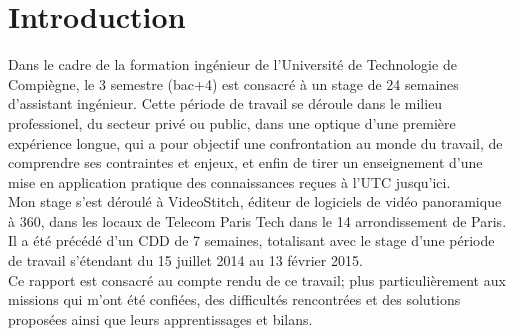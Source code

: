 \chapter*{Introduction}
Dans le cadre de la formation ingénieur de l'Université de Technologie de Compiègne,
le 3 semestre (bac+4) est consacré à un stage de 24 semaines d'assistant ingénieur.
Cette période de travail se déroule dans le milieu professionel, du secteur
privé ou public, dans une optique d'une première expérience longue, qui a pour
objectif une confrontation au monde du travail, de comprendre ses contraintes et 
enjeux, et enfin de tirer un enseignement d'une mise en application pratique des
connaissances reçues à l'UTC jusqu'ici.\\
\newline
Mon stage s'est déroulé à VideoStitch, éditeur de logiciels de vidéo panoramique
à 360\degree, dans les locaux de Telecom Paris Tech dans le 14 arrondissement de Paris. 
Il a été précédé d'un CDD de 7 semaines, totalisant avec le stage d'une période 
de travail s'étendant du 15 juillet 2014 au 13 février 2015.\\
\newline
Ce rapport est consacré au compte rendu de ce travail; plus particulièrement aux
missions qui m'ont été confiées, des difficultés rencontrées et des solutions
proposées ainsi que leurs apprentissages et bilans.

